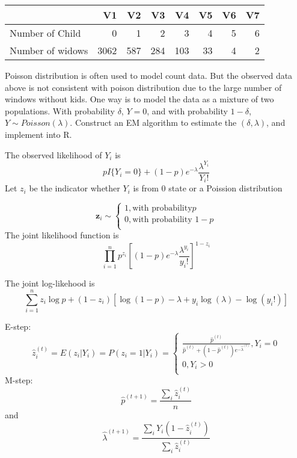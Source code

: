 \documentclass[]{article}
\begin{document}
\begin{longtable}[]{@{}lrrrrrrr@{}}
\toprule
& V1 & V2 & V3 & V4 & V5 & V6 & V7\tabularnewline
\midrule
\endhead
Number of Child & 0 & 1 & 2 & 3 & 4 & 5 & 6\tabularnewline
Number of widows & 3062 & 587 & 284 & 103 & 33 & 4 & 2\tabularnewline
\bottomrule
\end{longtable}

Poisson distribution is often used to model count data. But the observed
data above is not consistent with poison distribution due to the large
number of windows without kids. One way is to model the data as a
mixture of two populations. With probability \(\delta\), \(Y=0\), and
with probability \(1-\delta\), \(Y\sim Poisson (\lambda)\). Construct an
EM algorithm to estimate the \((\delta, \lambda)\), and implement into
R.

The observed likelihood of \(Y_i\) is
\[pI\{Y_i=0\}+(1-p) e^{-\lambda}\frac{\lambda^{Y_i}}{Y_i!}\] Let \(z_i\)
be the indicator whether \(Y_i\) is from \(0\) state or a Poission
distribution

\[\mathbf z_i\sim
\begin{cases}
1, \mbox{with probability}p \\
0, \mbox{with probability }1-p\\
\end{cases}
\] The joint likelihood function is
\[\prod_{i=1}^np^{z_i}\left[(1-p)e^{-\lambda}\frac{\lambda^{y_i}}{y_i!}\right]^{1-z_i}\]

The joint log-likehood is
\[\sum_{i=1}^nz_i\log p +(1-z_i)\left[\log (1-p) -\lambda+y_i\log(\lambda)-\log(y_i!)\right]\]

E-step: \[\widehat z_i^{(t)} = E(z_i|Y_i)= P(z_i=1|Y_i) = \begin{cases}
\frac{\widehat p^{(t)}}{\widehat p^{(t)}+(1-\widehat p^{(t)})e^{-\widehat\lambda^{(t)}}}, Y_i=0 \\
0, Y_i>0\\
\end{cases}\] M-step:
\[\widehat p^{(t+1)}=\frac{\sum_i \widehat z_i^{(t)}}{n}\] and
\[\widehat\lambda^{(t+1)} =\frac{\sum_i Y_i (1- \widehat z_i^{(t)})}{\sum_i \widehat z_i^{(t)}}\]
\end{document}
